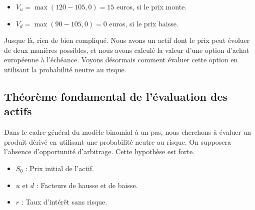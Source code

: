 \documentclass[12pt,a4paper]{article}
\begin{document}
\begin{itemize}
    \item \( V_u = \max(120 - 105, 0) = 15\) euros, si le prix monte.
    \item \( V_d = \max(90 - 105, 0) = 0\) euros, si le prix baisse.
\end{itemize}

\begin{center}
\end{center}

Jusque là, rien de bien compliqué. Nous avons un actif dont le prix peut évoluer de deux manières possibles, et nous avons calculé la valeur d'une option d'achat européenne à l'échéance. Voyons désormais comment évaluer cette option en utilisant la probabilité neutre au risque.

\subsection{Théorème fondamental de l'évaluation des actifs}

Dans le cadre général du modèle binomial à un pas, nous cherchons à évaluer un produit dérivé en utilisant une probabilité neutre au risque. On supposera l'absence d'opportunité d'arbitrage. Cette hypothèse est forte.

\begin{itemize}
    \item \( S_0 \) : Prix initial de l'actif.
    \item \( u \) et \( d \) : Facteurs de hausse et de baisse.
    \item \( r \) : Taux d'intérêt sans risque.
\end{itemize}
\end{document}
